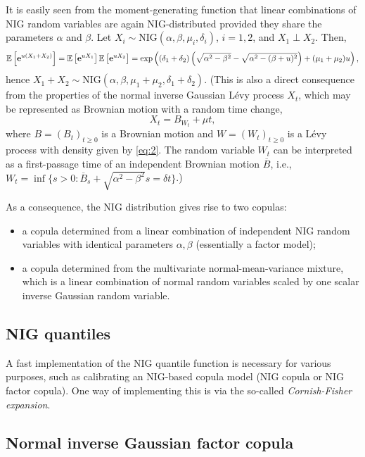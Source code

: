 It is easily seen from the moment-generating function that linear
combinations of NIG random variables are again NIG-distributed
provided they share the parameters $\alpha$ and $\beta$. Let $X_i\sim
\text{NIG}(\alpha, \beta, \mu_i, \delta_i)$, $i=1,2$, and $X_1\perp 
X_2$. Then, 
\begin{equation*}
  {\mathbb{E}}\left[{\bf e}^{u(X_1+X_2)}\right] = {\mathbb{E}}\left[{\bf e}^{u X_1}\right]
  {\mathbb{E}}\left[{\bf e}^{u X_2}\right] = \exp\left((\delta_1+\delta_2)
    \left(\sqrt{\alpha^2-\beta^2} - \sqrt{\alpha^2 -
        (\beta+u)^2}\right) + (\mu_1+\mu_2) u\right),
\end{equation*}
hence $X_1+X_2\sim \text{NIG}(\alpha, \beta, \mu_1+\mu_2,
\delta_1+\delta_2)$. (This is also a direct consequence from the
properties of 
the normal inverse Gaussian L\'evy process $X_t$, which may be
represented as Brownian motion with a random time change,
\begin{equation*}
  X_t = B_{W_t} + \mu t,
\end{equation*}
where $B=(B_t)_{t\geq 0}$ is a Brownian motion and $W=(W_t)_{t\geq 0}$
is a L\'evy process with density given by \eqref{eq:2}. The random
variable $W_t$ can be interpreted as a first-passage time of an
independent Brownian motion $\overline B$, i.e., $W_t=\inf\{s>0:
\overline B_s + \sqrt{\alpha^2-\beta^2}s = \delta t\}$.)

As a consequence, the NIG distribution gives rise to two copulas:
\begin{itemize}
\item a copula determined from a linear combination of independent NIG
  random variables with identical parameters $\alpha, \beta$
  (essentially a factor model);
\item a copula determined from the multivariate normal-mean-variance
  mixture, which is a linear combination of normal random variables
  scaled by one scalar inverse Gaussian random variable.
\end{itemize}

\subsection{NIG quantiles}
\label{sec:nig-quantiles}

A fast implementation of the NIG quantile function is necessary for
various purposes, such as calibrating an NIG-based copula model (NIG
copula or NIG factor copula). One way of implementing this is via the
so-called {\em Cornish-Fisher expansion}. 

\subsection{Normal inverse Gaussian factor copula}
\label{sec:norm-inverse-gauss}

